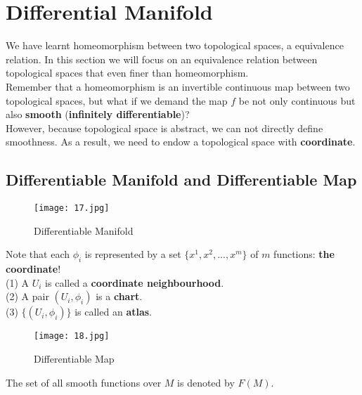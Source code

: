 \documentclass[openany,10pt]{book}
\theoremstyle{definition}
\theoremstyle{definition}
\theoremstyle{remark}
\begin{document}
\section{Differential Manifold}
We have learnt homeomorphism between two topological spaces, a equivalence relation. In this section we will focus on an equivalence relation between topological spaces that even 
finer than homeomorphism.\\
Remember that a homeomorphism is an invertible continuous map between two topological spaces, but what if we demand the map $f$ be not only continuous but also \textbf{smooth} (\textbf{infinitely differentiable})?\\
However, because topological space is abstract, we can not directly define smoothness. As a result, we need to endow a topological space with \textbf{coordinate}.
\subsection{Differentiable Manifold and Differentiable Map}
\begin{figure}[htbp]
  \centering
    \texttt{[image: 17.jpg]}
 \caption{Differentiable Manifold}
\end{figure}

Note that each $\phi_i$ is represented by a set $\{x^1,x^2,...,x^m\}$ of $m$ functions: \textbf{the coordinate}!\\
(1) A $U_i$ is called a \textbf{coordinate neighbourhood}.\\
(2) A pair $(U_i,\phi_i)$ is a \textbf{chart}.\\
(3) $\{(U_i,\phi_i)\}$ is called an \textbf{atlas}.\\
\begin{figure}[htbp]
  \centering
    \texttt{[image: 18.jpg]}
 \caption{Differentiable Map}
\end{figure}
The set of all smooth functions over $M$ is denoted by $F(M)$.
\end{document}
